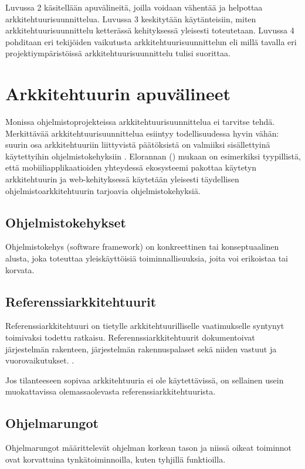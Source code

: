 Luvussa 2 käsitellään apuvälineitä, joilla voidaan vähentää ja helpottaa arkkitehtuurisuunnittelua. Luvussa 3 keskitytään käytänteisiin, miten arkkitehtuurisuunnittelu ketterässä kehityksessä yleisesti toteutetaan. Luvussa 4 pohditaan eri tekijöiden vaikutusta arkkitehtuurisuunnittelun eli millä tavalla eri projektiympäristöissä arkkitehtuurisuunnittelu tulisi suorittaa.

\chapter{Arkkitehtuurin apuvälineet}
Monissa ohjelmistoprojekteissa arkkitehtuurisuunnittelua ei tarvitse tehdä.
Merkittävää arkkitehtuurisuunnittelua esiintyy todellisuudessa hyvin vähän: suurin osa arkkitehtuuriin liittyvistä päätöksistä on valmiiksi sisällettyinä käytettyihin ohjelmistokehyksiin \citep{bellomo2014agilely}. Elorannan (\citeyear{eloranta2015techniques}) mukaan on esimerkiksi tyypillistä, että mobiiliapplikaatioiden yhteydessä ekosysteemi pakottaa käytetyn arkkitehtuurin ja web-kehityksessä käytetään yleisesti täydellisen ohjelmistoarkkitehtuurin tarjoavia ohjelmistokehyksiä.


\section{Ohjelmistokehykset}
Ohjelmistokehys (software framework) on konkreettinen tai konseptuaalinen alusta, joka toteuttaa yleiskäyttöisiä toiminnallisuuksia, joita voi erikoistaa tai korvata.


\section{Referenssiarkkitehtuurit}
Referenssiarkkitehtuuri on tietylle arkkitehtuurilliselle vaatimukselle syntynyt toimivaksi todettu ratkaisu. Referennssiarkkitehtuurit dokumentoivat järjestelmän rakenteen, järjestelmän rakennuspalaset sekä niiden vastuut ja vuorovaikutukset. \citep{vogel2011software}. 

Jos tilanteeseen sopivaa arkkitehtuuria ei ole käytettävissä, on sellainen usein muokattavissa olemassaolevasta referenssiarkkitehtuurista.
\section{Ohjelmarungot}
Ohjelmarungot määrittelevät ohjelman korkean tason ja niissä oikeat toiminnot ovat korvattuina tynkätoiminnoilla, kuten tyhjillä funktioilla.

